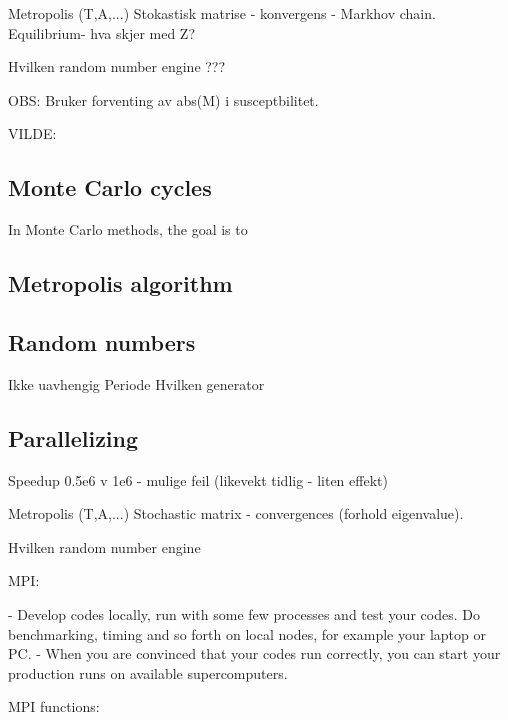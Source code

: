 
Metropolis (T,A,...)
	Stokastisk matrise  - konvergens - Markhov chain.
		Equilibrium- hva skjer med Z?
		
	Hvilken random number engine ??? 

	
	OBS: Bruker forventing av abs(M) i susceptbilitet. 



VILDE: 


\subsection{Monte Carlo cycles}

In Monte Carlo methods, the goal is to 





\subsection{Metropolis algorithm}

\subsection{Random numbers}

Ikke uavhengig
Periode
Hvilken generator


\subsection{Parallelizing}

Speedup
0.5e6 v 1e6 - mulige feil (likevekt tidlig - liten effekt)

Metropolis (T,A,...)
Stochastic matrix  - convergences (forhold eigenvalue).

Hvilken random number engine

MPI:	

- Develop codes locally, run with some few processes and test your codes. Do benchmarking, timing and so forth on local nodes, for example your laptop or PC.
- When you are convinced that your codes run correctly, you can start your production runs on available supercomputers.


MPI functions:
%
%
%
%
%
%
%
